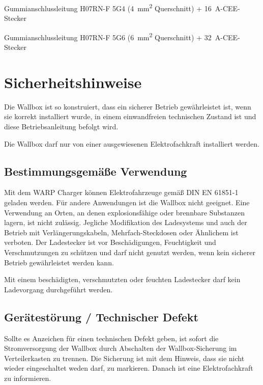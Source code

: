 \documentclass[a4paper,10pt]{article}
\newcommand{\hint}[1]{\begin{tcolorbox}[colback=boxgray,colframe=black,coltext=
white,title=Hinweis,left*=2mm,right*=2mm,boxsep=1mm,bottom=1mm,top=1mm]#1\end{tcolorbox}}
\begin{document}
\begin{multicols*}{2}
    \begin{description}[leftmargin=!,labelwidth=\widthof{\textbf{\SI{22}{\kilo\watt}}}]
        \item[\SI{11}{\kilo\watt}]Gummianschlussleitung H07RN-F 5G4
              (\SI{4}{\square\milli\meter}
              Querschnitt) + \SI{16}{\ampere}-CEE-Stecker
        \item[\SI{22}{\kilo\watt}]Gummianschlussleitung H07RN-F 5G6
              (\SI{6}{\square\milli\meter}
              Querschnitt) + \SI{32}{\ampere}-CEE-Stecker
    \end{description}

    \newpage
    \section{Sicherheitshinweise}
    Die Wallbox ist so konstruiert, dass ein sicherer Betrieb gewährleistet ist,
    wenn sie korrekt installiert wurde, in einem einwandfreien technischen Zustand
    ist und diese Betriebsanleitung befolgt wird. \hint{Die Wallbox darf nur von einer ausgewiesenen Elektrofachkraft installiert
        werden.}

    \subsection{Bestimmungsgemäße Verwendung}
    Mit dem WARP Charger können Elektrofahrzeuge gemäß DIN EN 61851-1 geladen
    werden. Für andere Anwendungen ist die Wallbox nicht geeignet. Eine Verwendung
    an Orten, an denen explosionsfähige oder brennbare Substanzen lagern, ist nicht
    zulässig. Jegliche Modifikation des Ladesystems und auch der Betrieb mit
    Verlängerungskabeln, Mehrfach-Steckdosen oder Ähnlichem ist verboten. Der
    Ladestecker ist vor Beschädigungen, Feuchtigkeit und Verschmutzungen zu
    schützen und darf nicht genutzt werden, wenn kein sicherer Betrieb
    gewährleistet werden kann. \hint{Mit einem beschädigten, verschmutzten oder feuchten Ladestecker darf kein Ladevorgang durchgeführt
        werden.}

    \subsection{Gerätestörung / Technischer Defekt}
    Sollte es Anzeichen für einen technischen Defekt geben, ist sofort die
    Stromversorgung der Wallbox durch Abschalten der Wallbox-Sicherung im Verteilerkasten zu trennen.
    Die Sicherung ist mit dem Hinweis, dass sie nicht wieder eingeschaltet weden darf, zu markieren.
    Danach ist eine Elektrofachkraft zu informieren.


\end{multicols*}
\end{document}
